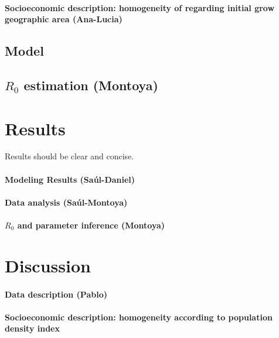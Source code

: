 \documentclass[draft, openbib]{imammb}
\numberwithin{equation}{section}
\begin{document}
            \paragraph{Socioeconomic description: 
                homogeneity of regarding initial
                grow geographic area (Ana-Lucia)}
        \subsection*{Model}
            
            
            
        \subsection{$R_0$ estimation (Montoya)}
    \section{Results}
        Results should be clear and concise.
        \paragraph{Modeling Results (Saúl-Daniel)}
        \paragraph{Data analysis (Saúl-Montoya)}
        \paragraph{$R_0$ and parameter inference (Montoya)}

    \section{Discussion}
            \label{sec:Intro}
            \paragraph{Data description (Pablo)}
            \paragraph{Socioeconomic description: 
                homogeneity according to population density index}
\end{document}
